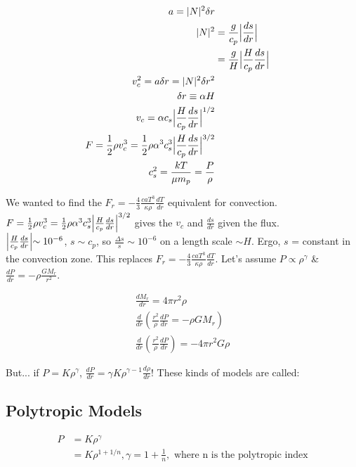 \documentclass[10pt,letterpaper,final]{book}
\newcommand{\pt}{\propto}
\newcommand{\rp}{\right)}
\newcommand{\lp}{\left(}
\begin{document}
\begin{align}
a = |N|^2 \delta r\\
|N|^2 &= \frac{g}{c_p} \Bigl\lvert \frac{ds}{dr} \Bigl\lvert\\
&= \frac{g}{H} \Bigl\lvert \frac{H}{c_p} \frac{ds}{dr} \Bigl\lvert\\
v_c^2 = a \delta r = |N|^2 \delta r^2\\
\delta r \equiv \alpha H\\
v_c = \alpha c_s \Bigl\lvert \frac{H}{c_p} \frac{ds}{dr} \Bigl\lvert^{1/2}\\
F = \frac{1}{2}\rho v_c^3 = \frac{1}{2} \rho \alpha ^3 c_s^3 \Bigl\lvert \frac{H}{c_p} \frac{ds}{dr} \Bigl\lvert ^{3/2}\\
c_s^2 = \frac{kT}{\mu m_p} = \frac{P}{\rho}
\end{align}

We wanted to find the $F_r = -\frac{4}{3} \frac{caT^3}{\kappa \rho}\frac{dT}{dr}$ equivalent for convection. $F = \frac{1}{2}\rho v_c^3 = \frac{1}{2} \rho \alpha ^3 c_s^3 \Bigl\lvert \frac{H}{c_p} \frac{ds}{dr} \Bigl\lvert ^{3/2}$ gives the $v_c$ and $\frac{ds}{dr}$ given the flux. \\

$\Bigl\lvert \frac{H}{c_p} \frac{ds}{dr} \Bigl\lvert \sim 10^{-6}$, $s \sim c_p$, so $\frac{\Delta s }{s} \sim 10^{-6}$ on a length scale $\sim H$. Ergo, $s$ = constant in the convection zone. This replaces $F_r = -\frac{4}{3} \frac{caT^3}{\kappa \rho}\frac{dT}{dr}$. Let's assume $P \pt \rho^\gamma$ \& $\frac{dP}{dr} = -\rho \frac{GM_r}{r^2}$. 

\begin{align}
\frac{dM_r}{dr} = 4 \pi r^2 \rho\\
\frac{d}{dr} \lp \frac{r^2}{\rho} \frac{dP}{dr} = -\rho GM_r \rp\\
\frac{d}{dr} \lp \frac{r^2}{\rho	} \frac{dP}{dr} \rp = -4\pi r^2 G\rho
\end{align}

But... if $P = K \rho^\gamma$, $\frac{dP}{dr} = \gamma K \rho^{\gamma-1} \frac{d\rho}{dr}$! These kinds of models are called:

\subsection{Polytropic Models}

\begin{align}
P &= K\rho^\gamma\\
&= K \rho^{1 + 1/n}, \gamma = 1 + \frac{1}{n}, \text{ where n is the polytropic index}
\end{align}
\end{document}
